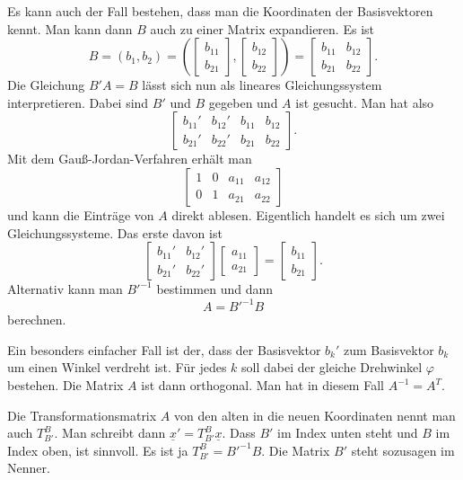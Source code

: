 \documentclass[a4paper,10pt,fleqn,twocolumn,twoside]{article}
\begin{document}
Es kann auch der Fall bestehen, dass man die Koordinaten der
Basisvektoren kennt. Man kann dann \(B\) auch zu einer Matrix
expandieren. Es ist
\[B = (b_1,b_2)
= (\begin{bmatrix}b_{11}\\ b_{21}\end{bmatrix},
\begin{bmatrix}b_{12}\\ b_{22}\end{bmatrix})
= \begin{bmatrix}
b_{11} & b_{12}\\
b_{21} & b_{22}
\end{bmatrix}.\]
Die Gleichung \(B'A=B\) lässt sich nun als lineares Gleichungssystem
interpretieren. Dabei sind \(B'\) und \(B\) gegeben und \(A\) ist
gesucht. Man hat also
\[\left[\begin{array}{cc|cc}
b_{11}' & b_{12}' & b_{11} & b_{12}\\
b_{21}' & b_{22}' & b_{21} & b_{22}
\end{array}\right].\]
Mit dem Gauß-Jordan-Verfahren erhält man
\[\left[\begin{array}{cc|cc}
1 & 0 & a_{11} & a_{12}\\
0 & 1 & a_{21} & a_{22}
\end{array}\right]\]
und kann die Einträge von \(A\) direkt ablesen.
Eigentlich handelt es sich um zwei Gleichungssysteme.
Das erste davon ist
\[\begin{bmatrix}
b_{11}' & b_{12}'\\
b_{21}' & b_{22}'
\end{bmatrix}
\begin{bmatrix}
a_{11}\\ a_{21}
\end{bmatrix}
= \begin{bmatrix}
b_{11}\\ b_{21}
\end{bmatrix}.\]
Alternativ kann man \(B'^{-1}\) bestimmen und dann
\[A = B'^{-1}B\]
berechnen.

Ein besonders einfacher Fall ist der, dass der Basisvektor \(b_k'\)
zum Basisvektor \(b_k\) um einen Winkel verdreht ist. Für jedes \(k\)
soll dabei der gleiche Drehwinkel \(\varphi\) bestehen. Die Matrix
\(A\) ist dann orthogonal. Man hat in diesem Fall \(A^{-1}=A^T\). 

Die Transformationsmatrix \(A\) von den
alten in die neuen Koordinaten nennt man auch \(T_{B'}^B\).
Man schreibt dann \(\underline x'=T_{B'}^B\underline x\).
Dass \(B'\) im Index unten steht und \(B\) im Index oben, ist sinnvoll.
Es ist ja \(T_{B'}^B=B'^{-1}B\). Die Matrix \(B'\) steht sozusagen
im Nenner.
\end{document}
